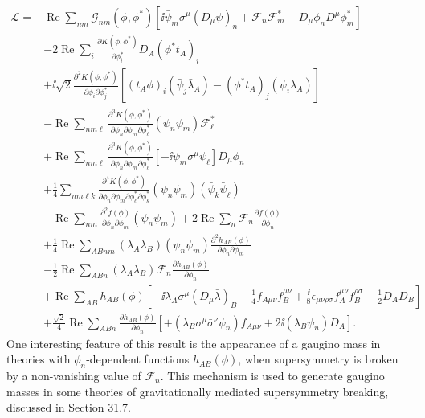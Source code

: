 \begin{equation}
  \begin{aligned}
  \mathcal{L}={}&
  \operatorname{Re}\sum_{nm}\mathcal{G}_{nm}(\phi,\phi^*)
  \left[
    \ii\bar\psi_m\bar\sigma^\mu(D_\mu\psi)_n
    +\mathcal{F}_n\mathcal{F}_m^*
    -D_\mu\phi_nD^\mu\phi_m^*
  \right]
  \\
  &-2\operatorname{Re}\sum_i
    \frac{\partial K(\phi,\phi^*)}{\partial\phi_i^*}
    D_A(\phi^*t_A)_i
  \\
  &+\ii\sqrt{2}
    \frac{\partial^2K(\phi,\phi^*)}
         {\partial\phi_i\partial\phi_j^*}
    \left[
      (t_A\phi)_i(\bar\psi_j\bar\lambda_A)
      -(\phi^*t_A)_j(\psi_i\lambda_A)
    \right]
  \\
  &-\operatorname{Re}\sum_{nm\ell}
    \frac{\partial^3K(\phi,\phi^*)}
         {\partial\phi_n\partial\phi_m\partial\phi_\ell^*}
    \left(\psi_n\psi_m\right)\mathcal{F}_\ell^*
  \\
  &+\operatorname{Re}\sum_{nm\ell}
    \frac{\partial^3K(\phi,\phi^*)}
         {\partial\phi_n\partial\phi_m\partial\phi_\ell^*}
    \left[-\ii\psi_m\sigma^\mu\bar\psi_\ell\right]D_\mu\phi_n
  \\
  &+\frac14\sum_{nm\ell k}
    \frac{\partial^4K(\phi,\phi^*)}
         {\partial\phi_n\partial\phi_m
          \partial\phi_\ell^*\partial\phi_k^*}
    \left(\psi_n\psi_m\right)
    \left(\bar\psi_k\bar\psi_\ell\right)
  \\
  &-\operatorname{Re}\sum_{nm}
    \frac{\partial^2f(\phi)}{\partial\phi_n\partial\phi_m}
    \left(\psi_n\psi_m\right)
  +2\operatorname{Re}\sum_n
    \mathcal{F}_n\frac{\partial f(\phi)}{\partial\phi_n}
  \\
  &+\frac14\operatorname{Re}\sum_{ABnm}
    \left(\lambda_A\lambda_B\right)
    \left(\psi_n\psi_m\right)
    \frac{\partial^2h_{AB}(\phi)}
         {\partial\phi_n\partial\phi_m}
  \\
  &-\frac12\operatorname{Re}\sum_{ABn}
    \left(\lambda_A\lambda_B\right)\mathcal{F}_n
    \frac{\partial h_{AB}(\phi)}{\partial\phi_n}
  \\
  &+\operatorname{Re}\sum_{AB}h_{AB}(\phi)
  \left[
    +\ii\lambda_A\sigma^\mu(D_\mu\bar\lambda)_B
    -\frac14f_{A\mu\nu}f_B^{\mu\nu}
    +\frac{\ii}{8}\epsilon_{\mu\nu\rho\sigma}
      f_A^{\mu\nu}f_B^{\rho\sigma}
    +\frac12D_AD_B
  \right]
  \\
  &+\frac{\sqrt{2}}4\operatorname{Re}\sum_{ABn}
    \frac{\partial h_{AB}(\phi)}{\partial\phi_n}
    \left[
      +\left(\lambda_B\sigma^\mu\bar\sigma^\nu\psi_n\right)
       f_{A\mu\nu}
      +2\ii\left(\lambda_B\psi_n\right)D_A
    \right].
  \end{aligned}
  \tag{27.4.42}\label{eq:27.4.42}
\end{equation}
One interesting feature of this result is the appearance of a gaugino mass
in theories with \(\phi_n\)-dependent functions \(h_{AB}(\phi)\), when
supersymmetry is broken by a non-vanishing value of \(\mathcal{F}_n\). This
mechanism is used to generate gaugino masses in some theories of
gravitationally mediated supersymmetry breaking, discussed in Section 31.7.
